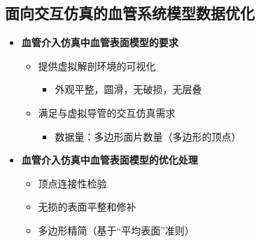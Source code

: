 \subsection[模型数据优化]{面向交互仿真的血管系统模型数据优化}

\begin{frame}
\begin{itemize}
\item \textbf{血管介入仿真中血管表面模型的要求}
\begin{itemize}
\pause \item 提供虚拟解剖环境的可视化
\begin{itemize}
\item 外观平整，圆滑，无破损，无层叠
\end{itemize}
\pause \item 满足与虚拟导管的交互仿真需求
\begin{itemize}
\item 数据量：多边形面片数量（多边形的顶点）
\end{itemize}
\end{itemize}
\pause \item \textbf{血管介入仿真中血管表面模型的优化处理}
\begin{itemize}
\pause \item 顶点连接性检验
\pause \item 无损的表面平整和修补
\pause \item 多边形精简（基于“平均表面”准则）
\end{itemize}
\end{itemize}
\end{frame}

% 

